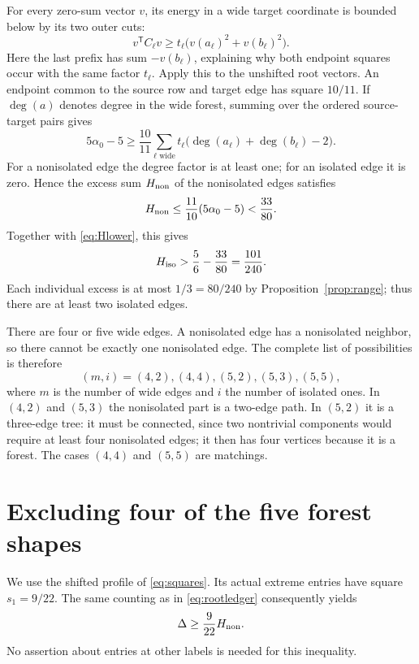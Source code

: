 \documentclass[11pt]{article}
\theoremstyle{definition}
\theoremstyle{remark}
\begin{document}
For every zero-sum vector $v$, its energy in a wide target coordinate is
bounded below by its two outer cuts:
\begin{equation}\label{eq:outerenergy}
 v^{\mathsf T}C_\ell v\geq
 t_\ell\bigl(v(a_\ell)^2+v(b_\ell)^2\bigr).
\end{equation}
Here the last prefix has sum $-v(b_\ell)$, explaining why both endpoint
squares occur with the same factor $t_\ell$.
Apply this to the unshifted root vectors. An endpoint common to the
source row and target edge has square $10/11$. If $\deg(a)$ denotes
degree in the wide forest, summing over the ordered source-target pairs
gives
\begin{equation}\label{eq:rootledger}
 5\alpha_0-5\geq\frac{10}{11}
 \sum_{\ell\text{ wide}}t_\ell
  \bigl(\deg(a_\ell)+\deg(b_\ell)-2\bigr).
\end{equation}
For a nonisolated edge the degree factor is at least one; for an
isolated edge it is zero. Hence the excess sum $H_{\rm non}$ of the
nonisolated edges satisfies
\[
 H_{\rm non}\leq\frac{11}{10}(5\alpha_0-5)<\frac{33}{80}.
\]
Together with \eqref{eq:Hlower}, this gives
\begin{equation}\label{eq:isolatedmass}
 H_{\rm iso}>\frac56-\frac{33}{80}=\frac{101}{240}.
\end{equation}
Each individual excess is at most $1/3=80/240$ by
Proposition~\ref{prop:range}; thus there are at least two isolated edges.

There are four or five wide edges. A nonisolated edge has a nonisolated
neighbor, so there cannot be exactly one nonisolated edge. The complete
list of possibilities is therefore
\begin{equation}\label{eq:cases}
 (m,i)=(4,2),(4,4),(5,2),(5,3),(5,5),
\end{equation}
where $m$ is the number of wide edges and $i$ the number of isolated
ones. In $(4,2)$ and $(5,3)$ the nonisolated part is a two-edge path.
In $(5,2)$ it is a three-edge tree: it must be connected, since two
nontrivial components would require at least four nonisolated edges;
it then has four vertices because it is a forest. The cases $(4,4)$
and $(5,5)$ are matchings.

\section{Excluding four of the five forest shapes}\label{sec:exclusions}

We use the shifted profile of \eqref{eq:squares}. Its actual extreme
entries have square $s_1=9/22$. The same counting as in
\eqref{eq:rootledger} consequently yields
\begin{equation}\label{eq:shiftednonisolated}
 \Delta\geq\frac9{22}H_{\rm non}.
\end{equation}
No assertion about entries at other labels is needed for this inequality.
\end{document}
